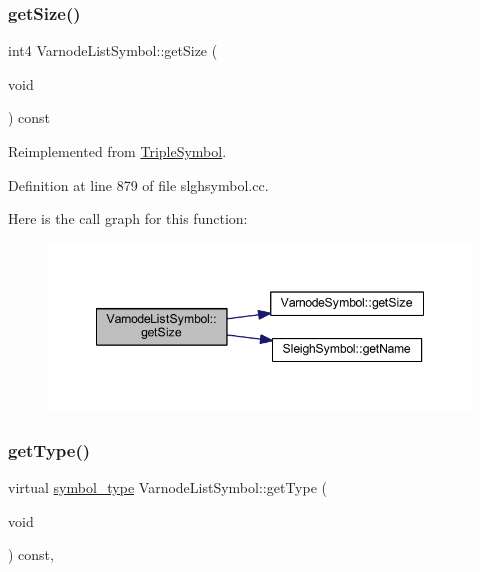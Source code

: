 \subsubsection{\texorpdfstring{getSize()}{getSize()}}
{\footnotesize\ttfamily int4 Varnode\+List\+Symbol\+::get\+Size (\begin{DoxyParamCaption}\item[{void}]{ }\end{DoxyParamCaption}) const\hspace{0.3cm}{\ttfamily [virtual]}}



Reimplemented from \mbox{\hyperlink{class_triple_symbol_a7351de4a1db140381d0b7913a8c613fd}{Triple\+Symbol}}.



Definition at line 879 of file slghsymbol.\+cc.

Here is the call graph for this function\+:
\nopagebreak
\begin{figure}[H]
\begin{center}
\leavevmode
\includegraphics[width=348pt]{class_varnode_list_symbol_a5958ff2358b0884cf1696eff69d51a18_cgraph}
\end{center}
\end{figure}
\mbox{\label{class_varnode_list_symbol_a2b543f4f683e29a4e044726051173897}} 
\subsubsection{\texorpdfstring{getType()}{getType()}}
{\footnotesize\ttfamily virtual \mbox{\hyperlink{class_sleigh_symbol_aba70f7f332fd63488c5ec4bd7807db41}{symbol\+\_\+type}} Varnode\+List\+Symbol\+::get\+Type (\begin{DoxyParamCaption}\item[{void}]{ }\end{DoxyParamCaption}) const\hspace{0.3cm}{\ttfamily [inline]}, {\ttfamily [virtual]}}



